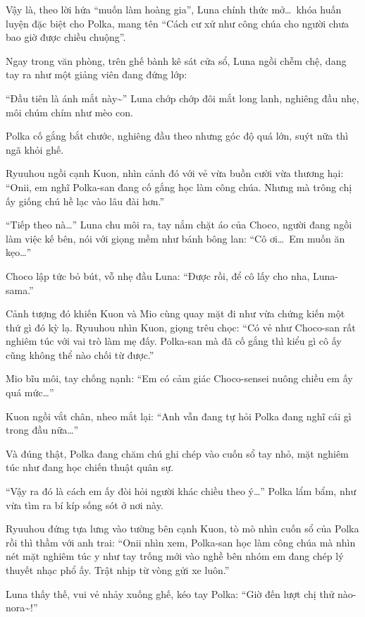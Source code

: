 \documentclass[../main.tex]{subfiles}
\begin{document}
\ct

Vậy là, theo lời hứa ``muốn làm hoàng gia'', Luna chính thức mở\dots\ khóa huấn luyện đặc biệt cho Polka, mang tên ``Cách cư xử như công chúa cho người chưa bao giờ được chiều chuộng''.


Ngay trong văn phòng, trên ghế bành kê sát cửa sổ, Luna ngồi chễm chệ, dang tay ra như một giảng viên đang đứng lớp:

``Đầu tiên là ánh mắt này\~{}'' Luna chớp chớp đôi mắt long lanh, nghiêng đầu nhẹ, môi chúm chím như mèo con.

Polka cố gắng bắt chước, nghiêng đầu theo nhưng góc độ quá lớn, suýt nữa thì ngã khỏi ghế.

Ryuuhou ngồi cạnh Kuon, nhìn cảnh đó với vẻ vừa buồn cười vừa thương hại: ``Onii, em nghĩ Polka-san đang cố gắng học làm công chúa. Nhưng mà trông chị ấy giống chú hề lạc vào lâu đài hơn.''

``Tiếp theo nà\dots'' Luna chu môi ra, tay nắm chặt áo của Choco, người đang ngồi làm việc kế bên, nói với giọng mềm như bánh bông lan: ``Cô ơi\dots\ Em muốn ăn kẹo\dots''

Choco lập tức bỏ bút, vỗ nhẹ đầu Luna: ``Được rồi, để cô lấy cho nha, Luna-sama.''

Cảnh tượng đó khiến Kuon và Mio cùng quay mặt đi như vừa chứng kiến một thứ gì đó kỳ lạ. Ryuuhou nhìn Kuon, giọng trêu chọc: ``Có vẻ như Choco-san rất nghiêm túc với vai trò làm mẹ đấy. Polka-san mà đã cố gắng thì kiểu gì cô ấy cũng không thể nào chối từ được.''

Mio bĩu môi, tay chống nạnh: ``Em có cảm giác Choco-sensei nuông chiều em ấy quá mức\dots''

Kuon ngồi vắt chân, nheo mắt lại: ``Anh vẫn đang tự hỏi Polka đang nghĩ cái gì trong đầu nữa\dots''

Và đúng thật, Polka đang chăm chú ghi chép vào cuốn sổ tay nhỏ, mặt nghiêm túc như đang học chiến thuật quân sự.

``Vậy ra đó là cách em ấy đòi hỏi người khác chiều theo ý\dots'' Polka lẩm bẩm, như vừa tìm ra bí kíp sống sót ở nơi này.

Ryuuhou đứng tựa lưng vào tường bên cạnh Kuon, tò mò nhìn cuốn sổ của Polka rồi thì thầm với anh trai: ``Onii nhìn xem, Polka-san học làm công chúa mà nhìn nét mặt nghiêm túc y như tay trống mới vào nghề bên nhóm em đang chép lý thuyết nhạc phổ ấy. Trật nhịp từ vòng gửi xe luôn.''

Luna thấy thế, vui vẻ nhảy xuống ghế, kéo tay Polka: ``Giờ đến lượt chị thử nào-nora\~{}!''
\end{document}
